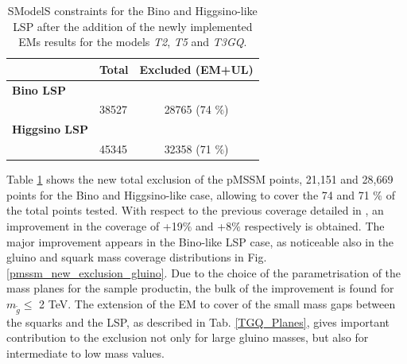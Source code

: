 \documentclass[epj,nopacs,fleqn]{svjour}
\begin{document}
\begin{table}[b]
\footnotesize
\begin{center}
\renewcommand{\arraystretch}{1.0}
\begin{tabular}{l l c }  \toprule  \toprule 
& \textbf{Total} & \textbf{Excluded (EM+UL)} \\ \toprule \toprule 
\textbf{Bino LSP} & &  \\
     & 38527 & 28765 (74 $\% $) \\ 
\textbf{Higgsino LSP} & &   \\
     & 45345 & 32358 (71 $\% $) \\ \bottomrule   \bottomrule  
\end{tabular}
\end{center}
\caption{SModelS constraints for the Bino and Higgsino-like LSP after the addition of the newly implemented EMs results for the models \textit{T2}, \textit{T5} and \textit{T3GQ}.}
\label{Res_Tab_New}
\end{table}
%
Table \ref{Res_Tab_New} shows the new total exclusion of the pMSSM points, 21,151 and 28,669 points for the Bino and Higgsino-like case, allowing to cover the 74 and 71 $\%$ of the total points tested. With respect to the previous coverage detailed in \cite{Ambrogi:2017lov}, an improvement in the coverage of +19$\%$ and +8$\%$ respectively is obtained.
%
The major improvement appears in the Bino-like LSP case, as noticeable also in the gluino and squark mass coverage distributions in Fig. \ref{pmssm_new_exclusion_gluino}. Due to the choice of the parametrisation of the mass planes for the sample productin, the bulk of the improvement is found for $m_{\tilde g}\leq$ 2 TeV. The extension of the EM to cover of the small mass gaps between the squarks and the LSP, as described in Tab. \ref{TGQ_Planes}, gives important contribution to the exclusion not only for large gluino masses, but also for intermediate to low mass values.
\end{document}
